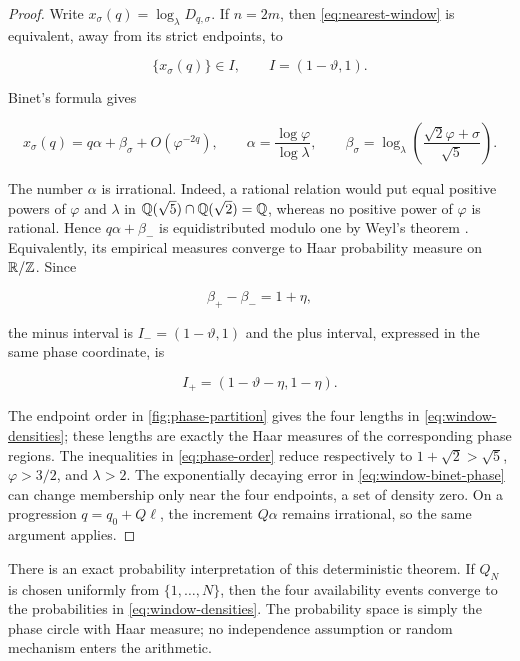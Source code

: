 \begin{proof}
Write $x_\sigma(q)=\log_\lambda D_{q,\sigma}$. If $n=2m$, then
\cref{eq:nearest-window} is equivalent, away from its strict endpoints, to

\begin{equation}
 \{x_\sigma(q)\}\in I,
 \qquad
 I=(1-\vartheta,1).
 \label{eq:single-window-interval}
\end{equation}

Binet's formula gives

\begin{equation}
 x_\sigma(q)=q\alpha+\beta_\sigma+O(\varphi^{-2q}),
 \qquad
 \alpha=\frac{\log\varphi}{\log\lambda},
 \qquad
 \beta_\sigma=\log_\lambda\left(
  \frac{\sqrt2\varphi+\sigma}{\sqrt5}
 \right).
 \label{eq:window-binet-phase}
\end{equation}

The number $\alpha$ is irrational. Indeed, a rational relation would put
equal positive powers of $\varphi$ and $\lambda$ in
$\mathbb{Q}(\sqrt5)\cap\mathbb{Q}(\sqrt2)=\mathbb{Q}$, whereas no positive power of $\varphi$ is
rational. Hence $q\alpha+\beta_-$ is equidistributed modulo one by Weyl's
theorem \cite{Weyl1916}. Equivalently, its empirical measures converge to
Haar probability measure on $\mathbb{R}/\mathbb{Z}$. Since

\begin{equation}
 \beta_+-\beta_-=1+\eta,
\end{equation}

the minus interval is $I_-=(1-\vartheta,1)$ and the plus interval, expressed
in the same phase coordinate, is

\begin{equation}
 I_+=(1-\vartheta-\eta,1-\eta).
 \label{eq:two-window-intervals}
\end{equation}

The endpoint order in \cref{fig:phase-partition} gives the four lengths in
\cref{eq:window-densities}; these lengths are exactly the Haar measures of
the corresponding phase regions. The inequalities in
\cref{eq:phase-order} reduce respectively to
$1+\sqrt2>\sqrt5$, $\varphi>3/2$, and $\lambda>2$. The exponentially
decaying error in \cref{eq:window-binet-phase} can change membership only
near the four endpoints, a set of density zero. On a progression
$q=q_0+Q\ell$, the increment $Q\alpha$ remains irrational, so the same
argument applies.
\end{proof}

There is an exact probability interpretation of this deterministic theorem.
If $Q_N$ is chosen uniformly from $\{1,\ldots,N\}$, then the four
availability events converge to the probabilities in
\cref{eq:window-densities}. The probability space is simply the phase circle
with Haar measure; no independence assumption or random mechanism enters
the arithmetic.

